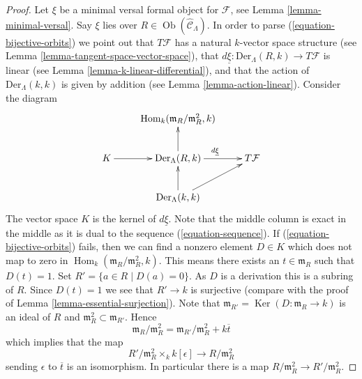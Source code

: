 \documentclass{stacks-project}
\theoremstyle{plain}
\theoremstyle{definition}
\theoremstyle{remark}
\numberwithin{equation}{subsection}
\def\Hom{\mathop{\mathrm{Hom}}\nolimits}
\def\Ob{\mathop{\mathrm{Ob}}\nolimits}
\def\Ker{\mathop{\mathrm{Ker}}}
\begin{document}
\begin{proof}
Let $\xi$ be a minimal versal formal object for $\mathcal{F}$, see
Lemma \ref{lemma-minimal-versal}.
Say $\xi$ lies over $R \in \Ob(\widehat{\mathcal{C}}_\Lambda)$.
In order to parse (\ref{equation-bijective-orbits}) we point out
that $T\mathcal{F}$ has a natural $k$-vector space structure
(see
Lemma \ref{lemma-tangent-space-vector-space}),
that $d\underline{\xi} : \text{Der}_\Lambda(R, k) \to T\mathcal{F}$
is linear (see
Lemma \ref{lemma-k-linear-differential}),
and that the action of $\text{Der}_\Lambda(k, k)$ is
given by addition (see
Lemma \ref{lemma-action-linear}).
Consider the diagram
$$
\xymatrix{
& \Hom_k(\mathfrak m_R/\mathfrak m_R^2, k) \\
K \ar[r] & \text{Der}_\Lambda(R, k) \ar[r]^{d\underline{\xi}} \ar[u] &
T\mathcal{F} \\
& \text{Der}_\Lambda(k, k) \ar[u] \ar[ru]
}
$$
The vector space $K$ is the kernel of $d\underline{\xi}$.
Note that the middle column is exact in the middle as it is dual to the
sequence (\ref{equation-sequence}). If (\ref{equation-bijective-orbits})
fails, then we can find a nonzero element $D \in K$ which
does not map to zero in $\Hom_k(\mathfrak m_R/\mathfrak m_R^2, k)$.
This means there exists an $t \in \mathfrak m_R$ such that
$D(t) = 1$. Set $R' = \{a \in R \mid D(a) = 0\}$. As $D$ is a derivation
this is a subring of $R$. Since $D(t) = 1$ we see that $R' \to k$
is surjective (compare with the proof of
Lemma \ref{lemma-essential-surjection}).
Note that $\mathfrak m_{R'} = \Ker(D : \mathfrak m_R \to k)$
is an ideal of $R$ and $\mathfrak m_R^2 \subset \mathfrak m_{R'}$. Hence
$$
\mathfrak m_R/\mathfrak m_R^2 =
\mathfrak m_{R'}/\mathfrak m_R^2 + k\overline{t}
$$
which implies that the map
$$
R'/\mathfrak m_R^2 \times_k k[\epsilon] \to R/\mathfrak m_R^2
$$
sending $\epsilon$ to $\overline{t}$ is an isomorphism. In particular
there is a map $R/\mathfrak m_R^2 \to R'/\mathfrak m_R^2$.


\end{proof}
\end{document}
